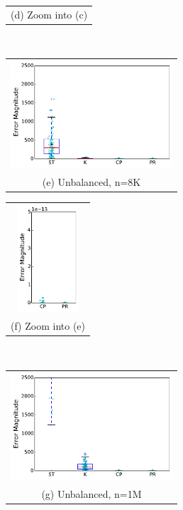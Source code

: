 \begin{figure}[!htb]
\begin{tabular}{c}
(d) Zoom into (c)\\
\end{tabular}
\endminipage 
 \\
\begin{tabular}{c}
\includegraphics[width=\textwidth, height=4cm]{chapter_2_figures/draft_boxplot_unbalanced_N=8192.pdf} \\
(e) Unbalanced, n=8K \\
\end{tabular}
\endminipage
{}
\begin{tabular}{c}
\includegraphics[width=\textwidth, height=4cm]{chapter_2_figures/draft_boxplot_unbalanced_cp_vs_preround_N=8192.pdf} \\
(f) Zoom into (e)\\
\end{tabular}
\endminipage 
 \\
\begin{tabular}{c}
\includegraphics[width=\textwidth, height=4cm]{chapter_2_figures/draft_boxplot_unbalanced_N=1048576.pdf} \\
(g) Unbalanced, n=1M\\
\end{tabular}
\endminipage 
{}

\end{figure}
